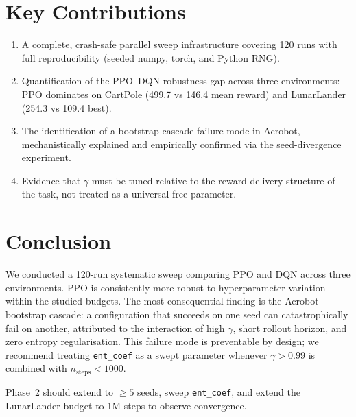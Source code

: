 \documentclass[10pt, a4paper, twocolumn]{article}
\begin{document}
\section{Key Contributions}

\begin{enumerate}
  \item A complete, crash-safe parallel sweep infrastructure covering 120 runs
        with full reproducibility (seeded numpy, torch, and Python RNG).

  \item Quantification of the PPO–DQN robustness gap across three environments:
        PPO dominates on CartPole (499.7 vs 146.4 mean reward) and LunarLander
        (254.3 vs 109.4 best).

  \item The identification of a bootstrap cascade failure mode in Acrobot,
        mechanistically explained and empirically confirmed via the seed-divergence
        experiment.

  \item Evidence that $\gamma$ must be tuned relative to the reward-delivery
        structure of the task, not treated as a universal free parameter.
\end{enumerate}

\section{Conclusion}

We conducted a 120-run systematic sweep comparing PPO and DQN across
three environments.
PPO is consistently more robust to hyperparameter variation within the
studied budgets.
The most consequential finding is the Acrobot bootstrap cascade: a
configuration that succeeds on one seed can catastrophically fail on another,
attributed to the interaction of high $\gamma$, short rollout horizon, and
zero entropy regularisation.
This failure mode is preventable by design; we recommend treating
\texttt{ent\_coef} as a swept parameter whenever $\gamma > 0.99$ is combined
with $n_\mathrm{steps} < 1000$.

Phase~2 should extend to $\geq5$ seeds, sweep \texttt{ent\_coef},
and extend the LunarLander budget to 1M steps to observe convergence.
\end{document}
